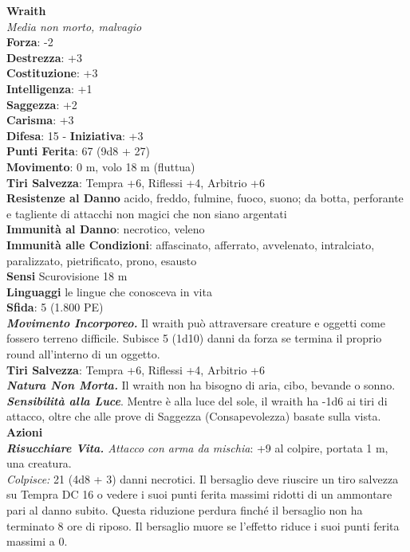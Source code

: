 \begin{multicols}{2}
\medskip\textbf{Wraith}\\
\emph{Media non morto, malvagio}\\
\textbf{Forza}: -2\\
\textbf{Destrezza}: +3\\
\textbf{Costituzione}: +3\\
\textbf{Intelligenza}: +1\\
\textbf{Saggezza}: +2\\
\textbf{Carisma}: +3\\
\textbf{Difesa}: 15 - \textbf{Iniziativa}: +3\\
\textbf{Punti Ferita}: 67 (9d8 + 27)\\
\textbf{Movimento}: 0 m, volo 18 m (fluttua)\\
\textbf{Tiri Salvezza}: Tempra +6, Riflessi +4, Arbitrio +6\\
\textbf{Resistenze al Danno} acido, freddo, fulmine, fuoco, suono; da botta, perforante e tagliente di attacchi non magici che non siano argentati\\
\textbf{Immunità al Danno}: necrotico, veleno\\
\textbf{Immunità alle Condizioni}: affascinato, afferrato, avvelenato, intralciato, paralizzato, pietrificato, prono, esausto\\
\textbf{Sensi} Scurovisione 18 m\\
\textbf{Linguaggi} le lingue che conosceva in vita\\
\textbf{Sfida}: 5 (1.800 PE)\smallskip\\
\emph{\textbf{Movimento Incorporeo.}} Il wraith può attraversare creature e oggetti come fossero terreno difficile. Subisce 5 (1d10) danni da forza se termina il proprio round all'interno di un oggetto.\\
\textbf{Tiri Salvezza}: Tempra +6, Riflessi +4, Arbitrio +6\\
\emph{\textbf{Natura Non Morta.}} Il wraith non ha bisogno di aria, cibo, bevande o sonno.\\
\emph{\textbf{Sensibilità alla Luce}}. Mentre è alla luce del sole, il wraith ha -1d6 ai tiri di attacco, oltre che alle prove di Saggezza (Consapevolezza) basate sulla vista.\\
\smallskip\textbf{Azioni}\\
\emph{\textbf{Risucchiare Vita.} Attacco con arma da mischia}: +9 al colpire, portata 1 m, una creatura.\\
\emph{Colpisce:} 21 (4d8 + 3) danni necrotici. Il bersaglio deve riuscire un tiro salvezza su Tempra DC  16 o vedere i suoi punti ferita massimi ridotti di un ammontare pari al danno subito. Questa riduzione perdura finché il bersaglio non ha terminato 8 ore di riposo. Il bersaglio muore se l'effetto riduce i suoi punti ferita massimi a 0.\\


\end{multicols}
